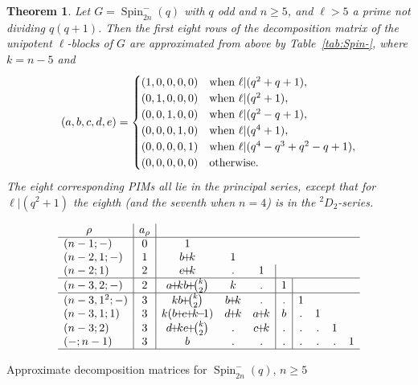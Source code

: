 \documentclass[12pt,leqno,a4paper]{amsart}
\newcommand{\Spin}{{\operatorname{Spin}}}
\newcommand{\tw}[1]{{}^{#1}\!}
\newcommand{\pl}{{\!+\!}}
\newcommand{\mn}{{\!-\!}}
\newtheorem{thm}{Theorem}[section]
\theoremstyle{remark}
\begin{document}
\begin{thm}   \label{thm:decD-}
 Let $G=\Spin_{2n}^-(q)$ with $q$ odd and $n\ge5$, and $\ell>5$ a prime not
 dividing $q(q+1)$. Then the first eight rows of the decomposition matrix of
 the unipotent $\ell$-blocks of $G$ are approximated from above by
 Table~\ref{tab:Spin-}, where $k=n-5$ and
 $$(a,b,c,d,e)=\begin{cases}
                         (1,0,0,0,0)& \text{when $\ell|(q^2+q+1)$},\cr
                         (0,1,0,0,0)& \text{when $\ell|(q^2+1)$},\cr
                         (0,0,1,0,0)& \text{when $\ell|(q^2-q+1)$},\cr
                         (0,0,0,1,0)& \text{when $\ell|(q^4+1)$},\cr
                         (0,0,0,0,1)& \text{when $\ell|(q^4-q^3+q^2-q+1)$},\cr
                         (0,0,0,0,0)& \text{otherwise}.\cr
 \end{cases}$$
 The eight corresponding PIMs all lie in the principal series, except that
 for $\ell|(q^2+1)$ the eighth (and the seventh when $n=4$) is in the
 $\tw2D_2$-series.
\end{thm}

\begin{table}[ht]
{\small\[\begin{array}{l|c|ccc|c|cccc}
  \qquad\rho& a_\rho\cr
\hline
   (n-1;-)& 0& 1\cr
 (n-2,1;-)& 1& b\pl k& 1\cr
    (n-2;1)& 2& e\pl k& .& 1\cr
\hline
 (n-3,2;-)& 2& a\pl kb\pl \binom{k}{2}& k& .& 1\cr
\hline
 (n-3,1^2;-)& 3& kb\pl \binom{k}{2}& b\pl k& .& .& 1\cr
  (n-3,1;1)& 3& k(b\pl e\pl k\mn1)& d\pl k& a\pl k& b& .& 1\cr
    (n-3;2)& 3& d\pl ke\pl \binom{k}{2}& .& c\pl k& .& .& .& 1\cr
   (-;n-1)& 3& b& .& .& .& .& .& .& 1\cr
\hline
\end{array}\]}
\caption{Approximate decomposition matrices for $\Spin_{2n}^-(q)$, $n\ge5$}
    \label {tab:Spin-}
\end{table}
\end{document}
